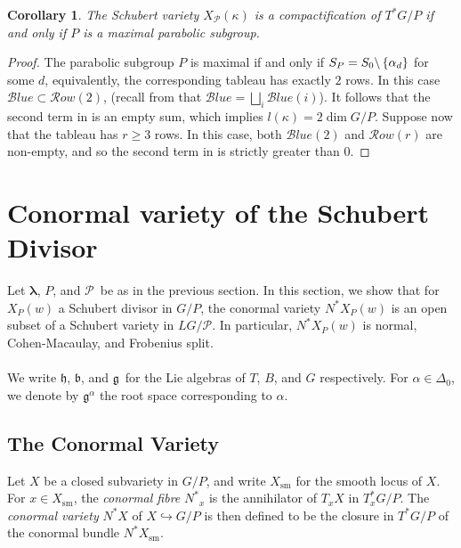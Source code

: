 \documentclass[paper=a4, fontsize=10pt]{amsart} %
\theoremstyle{plain}
\newtheorem{cor}[subsection]{Corollary}
\theoremstyle{definition}
\theoremstyle{remark}
\numberwithin{equation}{section} %
\numberwithin{figure}{section} %
\numberwithin{table}{section} %
\numberwithin{subsection}{section} %
\def\con{\ensuremath {N^*}}
\def\cartan{\ensuremath{\mathfrak h}}
\def\simple{\ensuremath{\Simple_0}}
\def\Simple{\ensuremath S}
\def\roots{\ensuremath{\Delta_0}}
\def\gl{\ensuremath{G}}
\def\lgl{\ensuremath{\mathfrak g}}
\def\gL{\ensuremath{L\gl}}
\def\gLhat{\gL}
\def\para{\ensuremath{P}}
\def\Para{\ensuremath{\mathcal P}}
\def\row{\ensuremath{\mathcal Row}}
\def\blue{\ensuremath{\mathcal Blue}}
\begin{document}
\begin{cor}
\label{maximalresult}
The Schubert variety $X_\Para(\kappa)$ is a compactification of $T^*G/P$ if and only if $P$ is a maximal parabolic subgroup.
\end{cor}
\begin{proof}
The parabolic subgroup $P$ is maximal if and only if $S_\para=\simple\backslash\left\{\alpha_d\right\}$ for some $d$, equivalently, the corresponding tableau has exactly $2$ rows. 
In this case $\blue\subset\row(2)$, (recall from  that $\blue=\bigsqcup\limits_i\blue(i)$).
It follows that the second term in  is an empty sum, which implies $l(\kappa)=2\dim\gl/\para$.
Suppose now that the tableau has $r\geq 3$ rows.
In this case, both $\blue(2)$ and $\row(r)$ are non-empty, and so the second term in  is strictly greater than $0$.
\end{proof}

%
\section{Conormal variety of the Schubert Divisor}
Let $\boldsymbol\lambda$, $P$, and \Para\ be as in the previous section.
In this section, we show that for $X_P(w)$ a Schubert divisor in $G/P$, the conormal variety $N^* X_P(w)$ is an open subset of a Schubert variety in $\gLhat/\Para$.
In particular, $N^* X_P(w)$ is normal, Cohen-Macaulay, and Frobenius split.
\\
\\
We write \cartan, $\mathfrak b$, and \lgl\ for the Lie algebras of $T$, $B$, and $G$ respectively. 
For $\alpha\in\roots$, we denote by $\lgl^\alpha$ the root space corresponding to $\alpha$.

\subsection{The Conormal Variety}
Let $X$ be a closed subvariety in $G/P$, and write $X_{\operatorname{sm}}$ for the smooth locus of $X$.
For $x\in X_{\operatorname{sm}}$, the \emph{conormal fibre} $\con_x$ is the annihilator of $T_xX$ in $T^*_xG/P$.
The \emph{conormal variety} $N^* X$ of $X\hookrightarrow\gl/P$ is then defined to be the closure in $T^*\gl/P$ of the conormal bundle $N^*X_{\operatorname{sm}}$.
\end{document}
